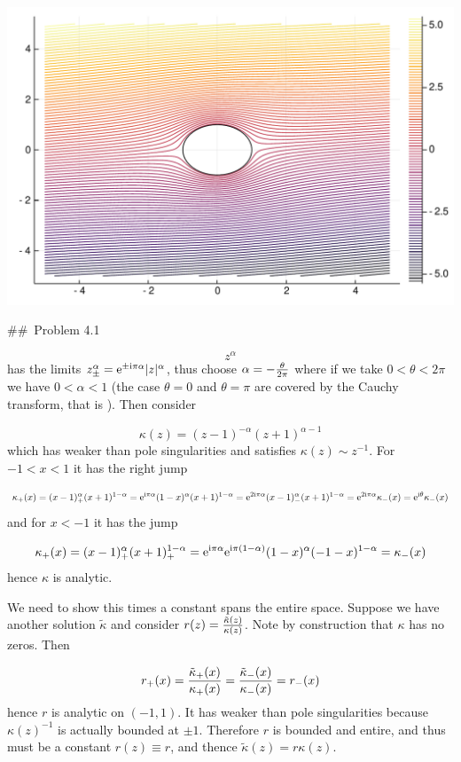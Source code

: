 \documentclass[12pt,a4paper]{article}
\def\I{ {\rm i} }
\def\E{ {\rm e} }
\begin{document}
\includegraphics[width=\linewidth]{figures/Solutions2_27_1.pdf}

\#\# Problem 4.1

\[
z^\alpha
\]
has the limits $z_\pm^\alpha = \E^{\pm \I  \pi \alpha} |z|^\alpha$, thus choose $\alpha = -{\theta \over 2\pi}$ where if we take $0 < \theta < 2\pi$ we have $0 < \alpha < 1$ (the case $\theta = 0$ and $\theta = \pi$ are covered by the Cauchy transform, that is ). Then consider

\[
\kappa(z) = (z-1)^{-\alpha} (z+1)^{\alpha-1}
\]
which has weaker than pole singularities and satisfies $\kappa(z) \sim z^{-1}$. For $-1 < x < 1$ it has the right jump

\[
\kappa_+(x) = (x-1)_+^\alpha (x+1)^{1 - \alpha}  = \E^{\I \pi \alpha} (1-x)^\alpha (x+1)^{1 - \alpha} = \E^{2\I \pi \alpha} (x-1)_-^\alpha (x+1)^{1 - \alpha} = \E^{2 \I \pi \alpha} \kappa_-(x)= \E^{\I \theta} \kappa_-(x)
\]
and  for $x < -1$ it has the jump

\[
\kappa_+(x) = (x-1)_+^\alpha (x+1)_+^{1 - \alpha}  = \E^{\I \pi \alpha}\E^{\I \pi (1-\alpha)} (1-x)^\alpha (-1-x)^{1 - \alpha} =  \kappa_-(x)
\]
hence $\kappa$ is analytic.  

We need to show this times a constant spans the entire space. Suppose we have another solution $\tilde \kappa$ and consider $r(z) = {\tilde \kappa(z) \over \kappa(z)}$. Note by construction that $\kappa$ has no zeros. Then

\[
r_+(x) = {\tilde\kappa_+(x) \over \kappa_+(x)} = {\tilde\kappa_-(x) \over \kappa_-(x)} = r_-(x)
\]
hence $r$ is analytic on $(-1,1)$. It has weaker than pole singularities because $\kappa(z)^{-1}$ is actually bounded at $\pm 1$. Therefore $r$ is bounded and entire, and thus must be a constant $r(z) \equiv r$, and thence $\tilde \kappa(z) = r \kappa(z)$.
\end{document}
